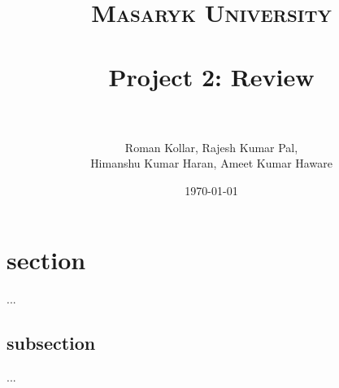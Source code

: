 \documentclass[paper=a4, fontsize=10pt]{scrartcl}
\title{	
\normalfont \normalsize 
\textsc{Masaryk University} \\ [25pt]
\horrule{0.5pt} \\[0.4cm]
\huge Project 2: Review  \\
\horrule{2pt} \\[0.5cm]
}
\author{Roman Kollar, Rajesh Kumar Pal,\\Himanshu Kumar Haran, Ameet Kumar Haware}
\date{\normalsize\today}
\begin{document}
\maketitle

\section{section}
...
\subsection{subsection}
...
\end{document}
